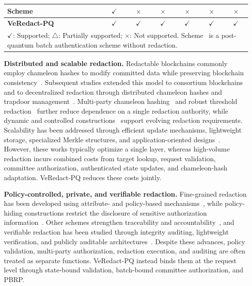 \documentclass[lettersize,journal]{IEEEtran}
\begin{document}
\begin{table}[t]
\begin{tabular}{lcccccc}
Scheme~\cite{ref39}
& $\checkmark$ & $\times$ & $\times$ & $\times$
& $\times$ & $\times$ \\

\hline
\textbf{VeRedact-PQ}
& $\checkmark$ & $\checkmark$ & $\checkmark$
& $\checkmark$ & $\checkmark$ & $\checkmark$ \\
\hline

\multicolumn{7}{l}{
\footnotesize $\checkmark$: Supported;
$\triangle$: Partially supported;
$\times$: Not supported. Scheme~\cite{ref39} is a
post-quantum batch authentication scheme without redaction.}
\end{tabular}
\end{table}
\noindent\textbf{Distributed and scalable redaction.}
Redactable blockchains commonly employ chameleon hashes to modify
committed data while preserving blockchain consistency~\cite{ref9}.
Subsequent studies extended this model to consortium
blockchains~\cite{ref2} and to decentralized redaction through
distributed chameleon hashes and trapdoor
management~\cite{ref1,ref3,ref6,ref19}. Multi-party chameleon
hashing~\cite{ref12} and robust threshold redaction~\cite{ref27}
further reduce dependence on a single redaction authority, while
dynamic and controlled constructions~\cite{ref5,ref16,ref36} support
evolving redaction requirements. Scalability has been addressed through
efficient update mechanisms, lightweight storage, specialized Merkle
structures, and application-oriented
designs~\cite{ref14,ref20,ref21,ref23,ref26}. However, these works
typically optimize a single layer, whereas high-volume redaction incurs
combined costs from target lookup, request validation, committee
authorization, authenticated state updates, and chameleon-hash
adaptation. VeRedact-PQ reduces these costs jointly.

\noindent\textbf{Policy-controlled, private, and verifiable redaction.}
Fine-grained redaction has been developed using attribute- and
policy-based mechanisms~\cite{ref8,ref15}, while policy-hiding
constructions restrict the disclosure of sensitive authorization
information~\cite{ref4,ref18,ref24,ref31,ref34}. Other schemes
strengthen traceability and accountability~\cite{ref25,ref28,ref29,ref32,ref35},
and verifiable redaction has been studied through integrity auditing,
lightweight verification, and publicly auditable
architectures~\cite{ref13,ref20,ref33}. Despite these advances, policy
validation, multi-party authorization, redaction execution, and
auditing are often treated as separate functions. VeRedact-PQ instead
binds them at the request level through state-bound validation,
batch-bound committee authorization, and PBRP.
\end{document}
